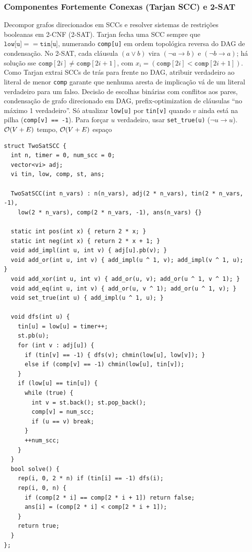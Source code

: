 \subsubsection{Componentes Fortemente Conexas (Tarjan SCC) e 2-SAT}
\algobox
  {Decompor grafos direcionados em SCCs e resolver sistemas de restrições booleanas em 2-CNF (2-SAT).}
  {Tarjan fecha uma SCC sempre que $\texttt{low[u]} == \texttt{tin[u]}$, numerando \texttt{comp[u]} em ordem topológica reversa do DAG de condensação. No 2-SAT, cada cláusula $(a \lor b)$ vira $(\neg a \to b)$ e $(\neg b \to a)$; há solução sse $\texttt{comp}[2i] \neq \texttt{comp}[2i+1]$, com $x_i = (\texttt{comp}[2i] < \texttt{comp}[2i+1])$.}
  {Como Tarjan extrai SCCs de trás para frente no DAG, atribuir verdadeiro ao literal de menor \texttt{comp} garante que nenhuma aresta de implicação vá de um literal verdadeiro para um falso.}
  {Decisão de escolhas binárias com conflitos aos pares, condensação de grafo direcionado em DAG, prefix-optimization de cláusulas ``no máximo 1 verdadeiro''.}
  {Só atualizar \texttt{low[u]} por \texttt{tin[v]} quando $v$ ainda está na pilha (\texttt{comp[v] == -1}). Para forçar $u$ verdadeiro, usar \texttt{set\_true(u)} ($ \neg u \to u$).}
  {$\mathcal{O}(V + E)$ tempo, $\mathcal{O}(V + E)$ espaço}

\begin{lstlisting}
struct TwoSatSCC {
  int n, timer = 0, num_scc = 0;
  vector<vi> adj;
  vi tin, low, comp, st, ans;

  TwoSatSCC(int n_vars) : n(n_vars), adj(2 * n_vars), tin(2 * n_vars, -1),
    low(2 * n_vars), comp(2 * n_vars, -1), ans(n_vars) {}

  static int pos(int x) { return 2 * x; }
  static int neg(int x) { return 2 * x + 1; }
  void add_impl(int u, int v) { adj[u].pb(v); }
  void add_or(int u, int v) { add_impl(u ^ 1, v); add_impl(v ^ 1, u); }
  void add_xor(int u, int v) { add_or(u, v); add_or(u ^ 1, v ^ 1); }
  void add_eq(int u, int v) { add_or(u, v ^ 1); add_or(u ^ 1, v); }
  void set_true(int u) { add_impl(u ^ 1, u); }

  void dfs(int u) {
    tin[u] = low[u] = timer++;
    st.pb(u);
    for (int v : adj[u]) {
      if (tin[v] == -1) { dfs(v); chmin(low[u], low[v]); }
      else if (comp[v] == -1) chmin(low[u], tin[v]);
    }
    if (low[u] == tin[u]) {
      while (true) {
        int v = st.back(); st.pop_back();
        comp[v] = num_scc;
        if (u == v) break;
      }
      ++num_scc;
    }
  }
  bool solve() {
    rep(i, 0, 2 * n) if (tin[i] == -1) dfs(i);
    rep(i, 0, n) {
      if (comp[2 * i] == comp[2 * i + 1]) return false;
      ans[i] = (comp[2 * i] < comp[2 * i + 1]);
    }
    return true;
  }
};
\end{lstlisting}

